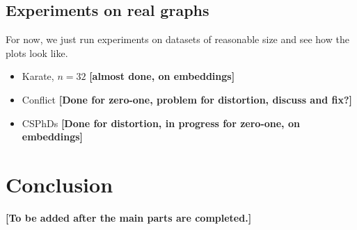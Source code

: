\documentclass{article} %
\begin{document}
\subsection{Experiments on real graphs}

For now, we just run experiments on datasets of reasonable size and see how the plots look like. 

\begin{itemize}
    \item Karate, $n = 32$ \textbf{[almost done, on embeddings]}
    \item Conflict \textbf{[Done for zero-one, problem for distortion, discuss and fix?]}
    \item CSPhDs \textbf{[Done for distortion, in progress for zero-one, on embeddings]}
    
\end{itemize}


\section{Conclusion}

\textbf{[To be added after the main parts are completed.]}






\end{document}
